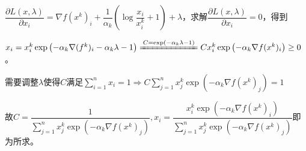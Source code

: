 \documentclass[cn,hazy,cyan,11pt,normal]{elegantnote}
\begin{document}
\begin{enumerate}
            $\dfrac{\partial L(x,\lambda)}{\partial x_i}=\nabla f(x^k)_i+\dfrac{1}{\alpha_k}\left(\log\dfrac{x_i}{x^k_i}+1\right)+\lambda$，求解$\dfrac{\partial L(x,\lambda)}{\partial x_i}=0$，得到

            $x_i=x^k_i\exp\left(-\alpha_k\nabla(f^k)_i-\alpha_k \lambda-1\right)\xlongequal{C=\exp(-\alpha_k \lambda-1)}Cx^k_i\exp\left(-\alpha_k\nabla f(x^k)_i\right)\geq 0$。

            需要调整$\lambda$使得$C$满足$\sum\limits_{i=1}^n x_i=1\Rightarrow C\sum_{j=1}^n x^k_j \exp\left(-\alpha_k\nabla f(x^k)_j\right)=1$

            故$C=\dfrac1{\sum_{j=1}^n x^k_j \exp\left(-\alpha_k\nabla f(x^k)_j\right)},x_i=\dfrac {x_i^k\exp\left(-\alpha_k\nabla f(x^k)_i\right)}{\sum_{j=1}^n x^k_j \exp\left(-\alpha_k\nabla f(x^k)_j\right)}$即为所求。
    \end{enumerate}
\end{document}
